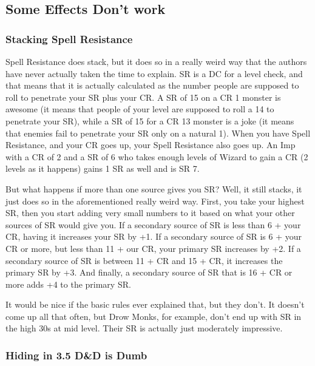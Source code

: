 
\subsection{Some Effects Don't work}

\subsubsection{Stacking Spell Resistance}

Spell Resistance does stack, but it does so in a really weird way that the authors have never actually taken the time to explain. SR is a DC for a level check, and that means that it is actually calculated as the number people are supposed to roll to penetrate your SR plus your CR. A SR of 15 on a CR 1 monster is awesome (it means that people of your level are supposed to roll a 14 to penetrate your SR), while a SR of 15 for a CR 13 monster is a joke (it means that enemies fail to penetrate your SR only on a natural 1). When you have Spell Resistance, and your CR goes up, your Spell Resistance also goes up. An Imp with a CR of 2 and a SR of 6 who takes enough levels of Wizard to gain a CR (2 levels as it happens) gains 1 SR as well and is SR 7.

But what happens if more than one source gives you SR? Well, it still stacks, it just does so in the aforementioned really weird way. First, you take your highest SR, then you start adding very small numbers to it based on what your other sources of SR would give you. If a secondary source of SR is less than 6 + your CR, having it increases your SR by +1. If a secondary source of SR is 6 + your CR or more, but less than 11 + our CR, your primary SR increases by +2. If a secondary source of SR is between 11 + CR and 15 + CR, it increases the primary SR by +3. And finally, a secondary source of SR that is 16 + CR or more adds +4 to the primary SR.

It would be nice if the basic rules ever explained that, but they don't. It doesn't come up all that often, but Drow Monks, for example, don't end up with SR in the high 30s at mid level. Their SR is actually just moderately impressive.

\subsubsection{Hiding in 3.5 D\&D is Dumb}


